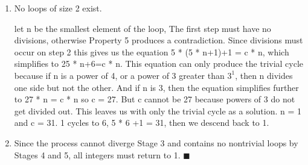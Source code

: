 \documentclass{article}
\begin{document}
\begin{enumerate}
\item No loops of size 2 exist.

let n be the smallest element of the loop, The first step must have no divisions, otherwise Property 5 produces a contradiction. Since divisions must occur on step 2 this gives us the equation 5 * (5 * n+1)+1 = c * n, which simplifies to 25 * n+6=c * n. This equation can only produce the trivial cycle because if n is a power of 4, or a power of 3 greater than $3^1$, then n divides one side but not the other. And if n is 3, then the equation simplifies further to 27 * n = c * n so c = 27. But c cannot be 27 because powers of 3 do not get divided out. This leaves us with only the trivial cycle as a solution. n = 1 and c = 31. 1 cycles to 6, 5 * 6 +1 = 31, then we descend back to 1.

\item Since the process cannot diverge Stage 3 and contains no nontrivial loops by Stages 4 and 5, all integers must return to 1. \huge{ $\blacksquare$}

\end{enumerate}
\end{document}
